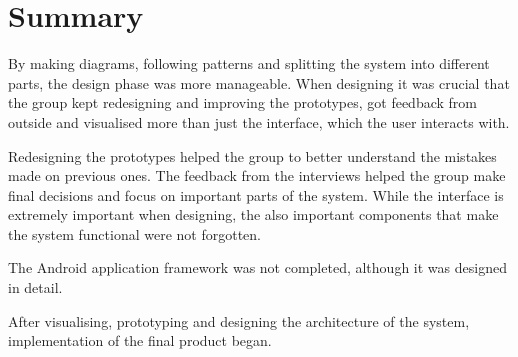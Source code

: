 \chapter{Summary}
By making diagrams, following patterns and splitting the system into different parts, the design phase was more manageable.
When designing it was crucial that the group kept redesigning and improving the prototypes, got feedback from outside and visualised more than just the interface, which the user interacts with.

Redesigning the prototypes helped the group to better understand the mistakes made on previous ones.
The feedback from the interviews helped the group make final decisions and focus on important parts of the system.
While the interface is extremely important when designing, the also important components that make the system functional were not forgotten. 

The Android application framework was not completed, although it was designed in detail. 

After visualising, prototyping and designing the architecture of the system, implementation of the final product began.


